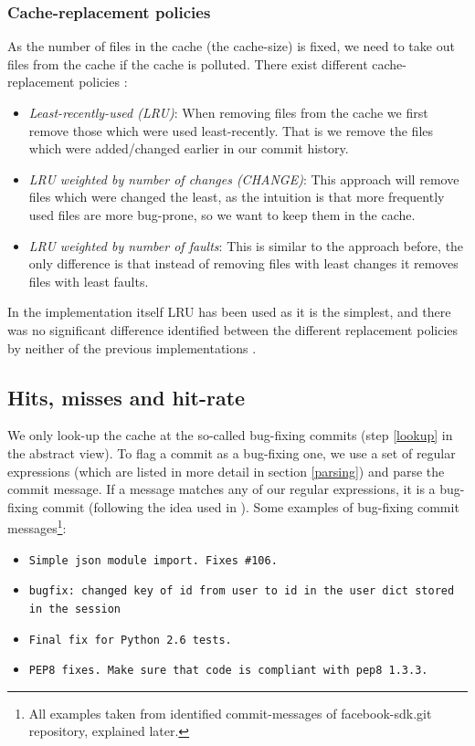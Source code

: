 \documentclass[12pt,twoside,notitlepage]{report}
\begin{document}
\subsubsection*{Cache-replacement policies}
As the number of files in the cache (the cache-size) is fixed, we need to take out files from the cache if the cache is polluted. There exist different cache-replacement policies \cite{FixCache}:
\begin{itemize}
\item \textit{Least-recently-used (LRU)}: When removing files from the cache we first remove those which were used least-recently. That is we remove the files which were added/changed earlier in our commit history.
\item \textit{LRU weighted by number of changes (CHANGE)}: This approach will remove files which were changed the least, as the intuition is that more frequently used files are more bug-prone, so we want to keep them in the cache.
\item \textit{LRU weighted by number of faults}: This is similar to the approach before, the only difference is that instead of removing files with least changes it removes files with least faults.
\end{itemize}
In the implementation itself LRU has been used as it is the simplest, and there was no significant difference identified between the different replacement policies by neither of the previous implementations \cite{FixCache}\cite{Sadowski}\cite{Bugcache}.
\subsection{Hits, misses and hit-rate}
We only look-up the cache at the so-called bug-fixing commits (step \ref{lookup} in the abstract view). To flag a commit as a bug-fixing one, we use a set of regular expressions (which are listed in more detail in section \ref{parsing}) and parse the commit message. If a message matches any of our regular expressions, it is a bug-fixing commit (following the idea used in \cite{KimZim}).
Some examples of bug-fixing commit messages\footnote{All examples taken from identified commit-messages of facebook-sdk.git repository, explained later.}:
\begin{itemize}
\item \texttt{Simple json module import. Fixes \#106.}

\item \texttt{bugfix: changed key of id from user to id in the user dict stored in the session}
\item \texttt{Final fix for Python 2.6 tests.}
\item \texttt{PEP8 fixes. Make sure that code is compliant with pep8 1.3.3.}
\end{itemize}
\end{document}
